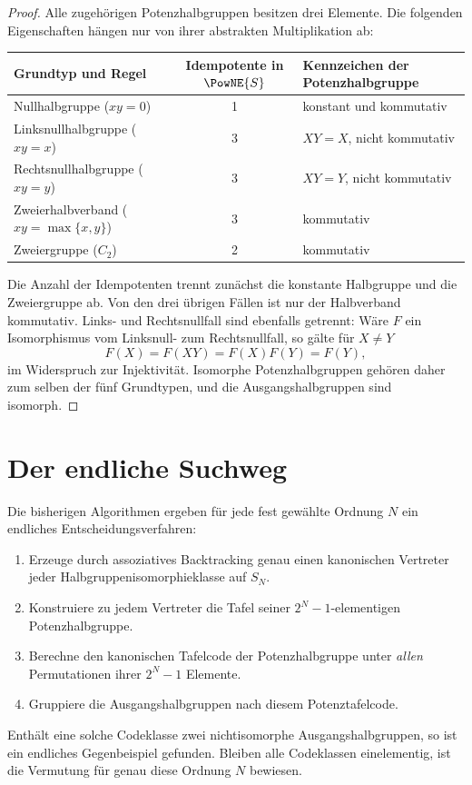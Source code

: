 \documentclass[main.tex]{subfiles}
\begin{document}
\begin{proof}
Alle zugehörigen Potenzhalbgruppen besitzen drei Elemente.  Die folgenden
Eigenschaften hängen nur von ihrer abstrakten Multiplikation ab:
\begin{center}
\small
\begin{tabularx}{\linewidth}{@{}>{\raggedright\arraybackslash}Xc
  >{\raggedright\arraybackslash}X@{}}
\toprule
\textbf{Grundtyp und Regel}&
\textbf{Idempotente in \(\PowNE{S}\)}&
\textbf{Kennzeichen der Potenzhalbgruppe}\\
\midrule
Nullhalbgruppe (\(xy=0\))&1&konstant und kommutativ\\
Linksnullhalbgruppe (\(xy=x\))&3&\(XY=X\), nicht kommutativ\\
Rechtsnullhalbgruppe (\(xy=y\))&3&\(XY=Y\), nicht kommutativ\\
Zweierhalbverband (\(xy=\max\{x,y\}\))&3&kommutativ\\
Zweiergruppe (\(C_2\))&2&kommutativ\\
\bottomrule
\end{tabularx}
\end{center}
Die Anzahl der Idempotenten trennt zunächst die konstante Halbgruppe und die
Zweiergruppe ab.  Von den drei übrigen Fällen ist nur der Halbverband
kommutativ.  Links- und Rechtsnullfall sind ebenfalls getrennt: Wäre
\(F\) ein Isomorphismus vom Linksnull- zum Rechtsnullfall, so gälte für
\(X\neq Y\)
\[
  F(X)=F(XY)=F(X)F(Y)=F(Y),
\]
im Widerspruch zur Injektivität.  Isomorphe Potenzhalbgruppen gehören daher
zum selben der fünf Grundtypen, und die Ausgangshalbgruppen sind isomorph.
\end{proof}

\section{Der endliche Suchweg}

Die bisherigen Algorithmen ergeben für jede fest gewählte Ordnung \(N\) ein
endliches Entscheidungsverfahren:
\begin{enumerate}
  \item Erzeuge durch assoziatives Backtracking genau einen kanonischen
    Vertreter jeder Halbgruppenisomorphieklasse auf \(S_N\).
  \item Konstruiere zu jedem Vertreter die Tafel seiner
    \(2^N-1\)-elementigen Potenzhalbgruppe.
  \item Berechne den kanonischen Tafelcode der Potenzhalbgruppe unter
    \emph{allen} Permutationen ihrer \(2^N-1\) Elemente.
  \item Gruppiere die Ausgangshalbgruppen nach diesem Potenztafelcode.
\end{enumerate}
Enthält eine solche Codeklasse zwei nichtisomorphe Ausgangshalbgruppen, so ist
ein endliches Gegenbeispiel gefunden.  Bleiben alle Codeklassen einelementig,
ist die Vermutung für genau diese Ordnung \(N\) bewiesen.
\end{document}
